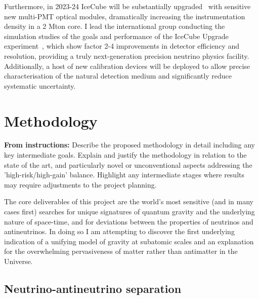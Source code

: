 \documentclass[a4paper,11pt]{article}
\begin{document}
Furthermore, in 2023-24 IceCube will be substantially upgraded~\cite{IceCubeUpgrade_ICRC2019} with sensitive new multi-PMT optical modules, dramatically increasing the instrumentation density in a 2 Mton core. I lead the international group conducting the simulation studies of the goals and performance of the IceCube Upgrade experiment~\cite{IceCubeUpgrade_ICRC2019, NuFactProceedings}, which show factor 2-4 improvements in detector efficiency and resolution, providing a truly next-generation precision neutrino physics facility. Additionally, a host of new calibration devices will be deployed to allow precise characterisation of the natural detection medium and significantly reduce systematic uncertainty.\\




\section{Methodology}
\vspace{0.1 cm}

\textbf{From instructions:} Describe the proposed methodology in detail including any key
intermediate goals. Explain and justify the methodology in relation to the state of the art, and
particularly novel or unconventional aspects addressing the 'high-risk/high-gain' balance. Highlight
any intermediate stages where results may require adjustments to the project planning. 


The core deliverables of this project are the world's most sensitive (and in many cases first) searches for unique signatures of quantum gravity and the underlying nature of space-time, and for deviations between the properties of neutrinos and antineutrinos. In doing so I am attempting to discover the first underlying indication of a unifying model of gravity at subatomic scales and an explanation for the overwhelming pervasiveness of matter rather than antimatter in the Universe. \\


\subsection{Neutrino-antineutrino separation}
\end{document}
